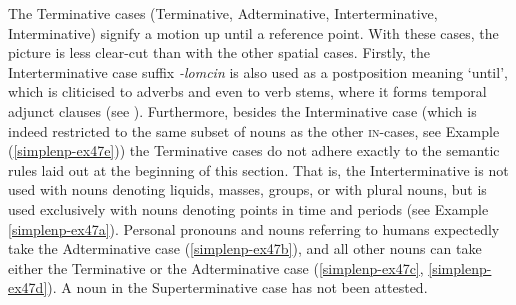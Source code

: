The Terminative cases (Terminative, Adterminative, Interterminative, Interminative) signify a motion up until a reference point. With these cases, the picture is less clear-cut than with the other spatial cases. Firstly, the Interterminative case suffix \textit{-lomcin} is also used as a postposition meaning `until', which is cliticised to adverbs and even to verb stems, where it forms temporal adjunct clauses (see ). Furthermore, besides the Interminative case (which is indeed restricted to the same subset of nouns as the other \textsc{in}-cases, see Example (\ref{simplenp-ex47e})) the Terminative cases do not adhere exactly to the semantic rules laid out at the beginning of this section. That is, the Interterminative is not used with nouns denoting liquids, masses, groups, or with plural nouns, but is used exclusively with nouns denoting points in time and periods (see Example \ref{simplenp-ex47a}). Personal pronouns and nouns referring to humans expectedly take the Adterminative case (\ref{simplenp-ex47b}), and all other nouns can take either the Terminative or the Adterminative case (\ref{simplenp-ex47c}, \ref{simplenp-ex47d}). A noun in the Superterminative case has not been attested.


